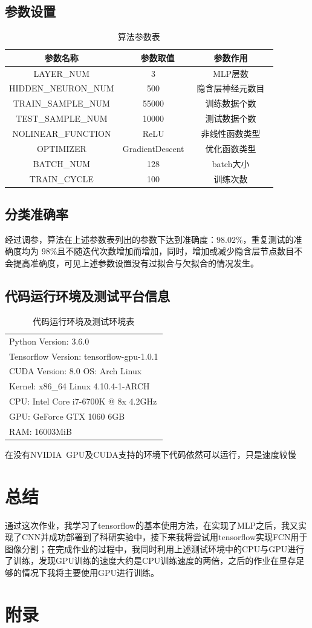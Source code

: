 \documentclass[a4paper, UTF8]{ctexrep}
\begin{document}
    \subsection{参数设置}
      \begin{table}[h!]
        \centering
        \begin{tabular}{ccc}
          \hline
          参数名称 &　参数取值 & 参数作用 \\
          \hline
          LAYER\_NUM & 3 & MLP层数　\\
          HIDDEN\_NEURON\_NUM & 500 & 隐含层神经元数目　\\
          TRAIN\_SAMPLE\_NUM & 55000 & 训练数据个数　\\
          TEST\_SAMPLE\_NUM & 10000 & 测试数据个数　\\
          NOLINEAR\_FUNCTION & ReLU & 非线性函数类型　\\
          OPTIMIZER & GradientDescent & 优化函数类型　\\
          BATCH\_NUM & 128 & batch大小　\\
          TRAIN\_CYCLE & 100 & 训练次数　\\
          \hline
        \end{tabular}
        \caption{算法参数表}
      \end{table}
    \subsection{分类准确率}
      经过调参，算法在上述参数表列出的参数下达到准确度：$98.02\%$，重复测试的准确度均为 $98\%$且不随迭代次数增加而增加，同时，增加或减少隐含层节点数目不会提高准确度，可见上述参数设置没有过拟合与欠拟合的情况发生。
    \subsection{代码运行环境及测试平台信息}
      \begin{table}[htbp!]
        \centering
        \begin{tabular}{l}
          \hline
          Python Version: 3.6.0 \\
          Tensorflow Version: tensorflow-gpu-1.0.1 \\
          CUDA Version: 8.0
          OS: Arch Linux \\
          Kernel: x86\_64 Linux 4.10.4-1-ARCH \\
          CPU: Intel Core i7-6700K @ 8x 4.2GHz \\
          GPU: GeForce GTX 1060 6GB \\
          RAM: 16003MiB \\
          \hline
        \end{tabular}
        \caption{代码运行环境及测试环境表}
      \end{table}
      在没有NVIDIA\ GPU及CUDA支持的环境下代码依然可以运行，只是速度较慢
    \section{总结}
      通过这次作业，我学习了tensorflow的基本使用方法，在实现了MLP之后，我又实现了CNN并成功部署到了科研实验中，接下来我将尝试用tensorflow实现FCN用于图像分割；在完成作业的过程中，我同时利用上述测试环境中的CPU与GPU进行了训练，发现GPU训练的速度大约是CPU训练速度的两倍，之后的作业在显存足够的情况下我将主要使用GPU进行训练。
		\section{附录}
\end{document}
